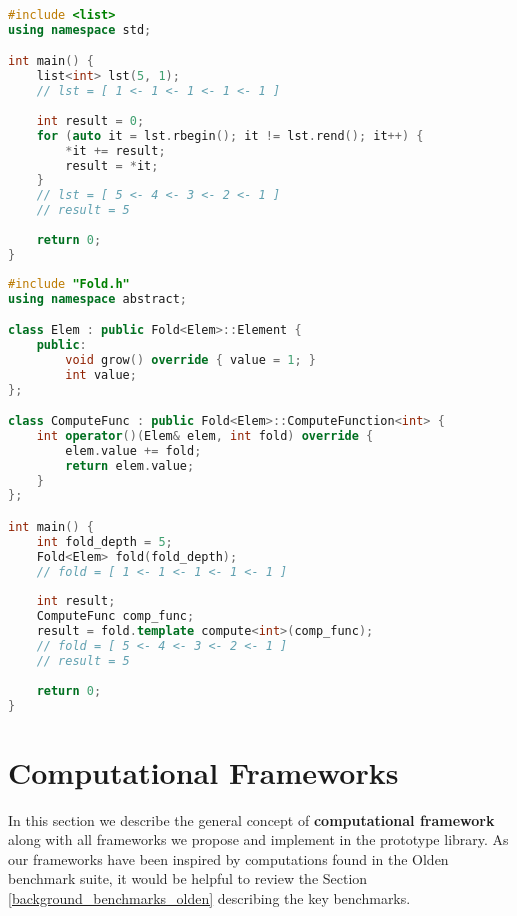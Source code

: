 \begin{lstlisting}[caption={Right fold computation using standard STL list class template},label={lst:left_fold_list},language=C++]
#include <list>
using namespace std;

int main() {
    list<int> lst(5, 1);
    // lst = [ 1 <- 1 <- 1 <- 1 <- 1 ]
    
    int result = 0;
    for (auto it = lst.rbegin(); it != lst.rend(); it++) {
        *it += result;
        result = *it;
    }
    // lst = [ 5 <- 4 <- 3 <- 2 <- 1 ]
    // result = 5
    
    return 0;
}
\end{lstlisting}

\begin{lstlisting}[caption={Right fold computation using our Fold computational framework},label={lst:left_fold_framework},language=C++]
#include "Fold.h"
using namespace abstract;

class Elem : public Fold<Elem>::Element {
    public:
        void grow() override { value = 1; }
        int value;
};

class ComputeFunc : public Fold<Elem>::ComputeFunction<int> {
    int operator()(Elem& elem, int fold) override {
        elem.value += fold;
        return elem.value;
    }
};

int main() {
    int fold_depth = 5;
    Fold<Elem> fold(fold_depth);
    // fold = [ 1 <- 1 <- 1 <- 1 <- 1 ]
    
    int result;
    ComputeFunc comp_func;
    result = fold.template compute<int>(comp_func);
    // fold = [ 5 <- 4 <- 3 <- 2 <- 1 ]
    // result = 5
    
    return 0;
}
\end{lstlisting}

\section{Computational Frameworks}
\label{frameworks_main}
\quad In this section we describe the general concept of \textbf{computational framework} along with all frameworks we propose and implement in the prototype library. As our frameworks have been inspired by computations found in the Olden benchmark suite, it would be helpful to review the Section \ref{background_benchmarks_olden} describing the key benchmarks.
